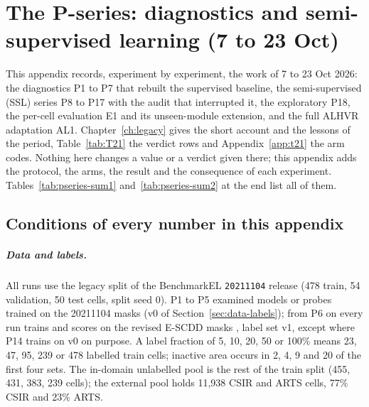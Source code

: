 \chapter{The P-series: diagnostics and semi-supervised learning (7 to 23 Oct)}\label{app:pseries}

This appendix records, experiment by experiment, the work of 7 to 23 Oct 2026: the diagnostics P1 to P7 that rebuilt the supervised
baseline, the semi-supervised (SSL) series P8 to P17 with the audit that interrupted it, the exploratory P18, the per-cell
evaluation E1 and its unseen-module extension, and the full ALHVR adaptation AL1. Chapter~\ref{ch:legacy} gives the short account
and the lessons of the period, Table~\ref{tab:T21} the verdict rows and Appendix~\ref{app:t21} the arm codes. Nothing here changes a
value or a verdict given there; this appendix adds the protocol, the arms, the result and the consequence of each experiment.
Tables~\ref{tab:pseries-sum1} and~\ref{tab:pseries-sum2} at the end list all of them.

\section{Conditions of every number in this appendix}\label{sec:pseries-conditions}

\paragraph{Data and labels.} All runs use the legacy split of the BenchmarkEL \texttt{20211104} release (478 train, 54 validation, 50
test cells, split seed 0). P1 to P5 examined models or probes trained on the 20211104 masks (v0 of Section~\ref{sec:data-labels}); from P6 on every run trains and
scores on the revised E-SCDD masks \citep{hanifi2025escdd}, label set v1, except where P14 trains on v0 on purpose. A label
fraction of 5, 10, 20, 50 or 100\% means 23, 47, 95, 239 or 478 labelled train cells; inactive area occurs in 2, 4, 9 and 20 of the
first four sets. The in-domain unlabelled pool is the rest of the train split (455, 431, 383, 239 cells); the external pool holds
11,938 CSIR and ARTS cells, 77\% CSIR and 23\% ARTS.

